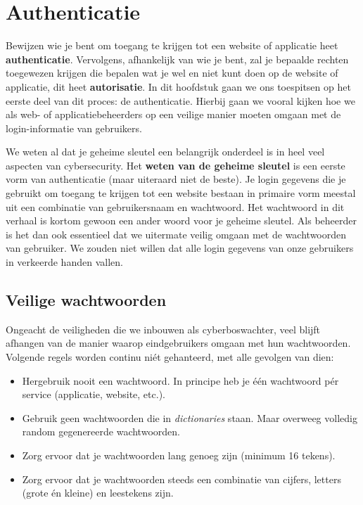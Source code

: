 \documentclass[
  10pt,
  dutch,
  paper=a4,
  ,captions=tableheading
]{scrbook}
\providecommand{\tightlist}{%
  \setlength{\itemsep}{0pt}\setlength{\parskip}{0pt}}
\begin{document}
\chapter{Authenticatie}\label{authenticatie-1}

Bewijzen wie je bent om toegang te krijgen tot een website of applicatie
heet \textbf{authenticatie}. Vervolgens, afhankelijk van wie je bent,
zal je bepaalde rechten toegewezen krijgen die bepalen wat je wel en
niet kunt doen op de website of applicatie, dit heet
\textbf{autorisatie}. In dit hoofdstuk gaan we ons toespitsen op het
eerste deel van dit proces: de authenticatie. Hierbij gaan we vooral
kijken hoe we als web- of applicatiebeheerders op een veilige manier
moeten omgaan met de login-informatie van gebruikers.

We weten al dat je geheime sleutel een belangrijk onderdeel is in heel
veel aspecten van cybersecurity. Het \textbf{weten van de geheime
sleutel} is een eerste vorm van authenticatie (maar uiteraard niet de
beste). Je login gegevens die je gebruikt om toegang te krijgen tot een
website bestaan in primaire vorm meestal uit een combinatie van
gebruikersnaam en wachtwoord. Het wachtwoord in dit verhaal is kortom
gewoon een ander woord voor je geheime sleutel. Als beheerder is het dan
ook essentieel dat we uitermate veilig omgaan met de wachtwoorden van
gebruiker. We zouden niet willen dat alle login gegevens van onze
gebruikers in verkeerde handen vallen.

\section{Veilige wachtwoorden}\label{veilige-wachtwoorden}

Ongeacht de veiligheden die we inbouwen als cyberboswachter, veel blijft
afhangen van de manier waarop eindgebruikers omgaan met hun
wachtwoorden. Volgende regels worden continu niét gehanteerd, met alle
gevolgen van dien:

\begin{itemize}
\tightlist
\item
  Hergebruik nooit een wachtwoord. In principe heb je één wachtwoord pér
  service (applicatie, website, etc.).
\item
  Gebruik geen wachtwoorden die in \emph{dictionaries} staan. Maar
  overweeg volledig random gegenereerde wachtwoorden.
\item
  Zorg ervoor dat je wachtwoorden lang genoeg zijn (minimum 16 tekens).
\item
  Zorg ervoor dat je wachtwoorden steeds een combinatie van cijfers,
  letters (grote én kleine) en leestekens zijn.
\end{itemize}
\end{document}
